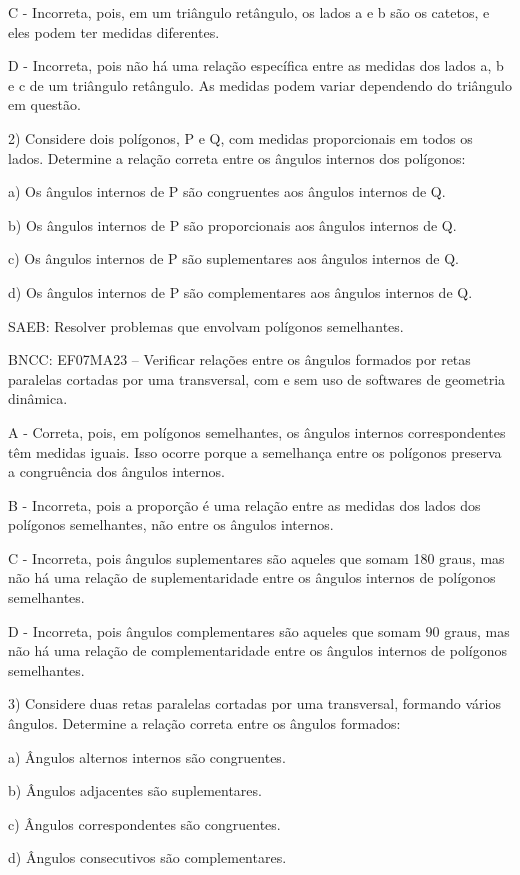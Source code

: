 C - Incorreta, pois, em um triângulo retângulo, os lados a e b são os
catetos, e eles podem ter medidas diferentes.

D - Incorreta, pois não há uma relação específica entre as medidas dos
lados a, b e c de um triângulo retângulo. As medidas podem variar
dependendo do triângulo em questão.

2) Considere dois polígonos, P e Q, com medidas proporcionais em todos
os lados. Determine a relação correta entre os ângulos internos dos
polígonos:

a) Os ângulos internos de P são congruentes aos ângulos internos de Q.

b) Os ângulos internos de P são proporcionais aos ângulos internos de Q.

c) Os ângulos internos de P são suplementares aos ângulos internos de Q.

d) Os ângulos internos de P são complementares aos ângulos internos de
Q.

SAEB: Resolver problemas que envolvam polígonos semelhantes.

BNCC: EF07MA23 -- Verificar relações entre os ângulos formados por retas
paralelas cortadas por uma transversal, com e sem uso de softwares de
geometria dinâmica.

A - Correta, pois, em polígonos semelhantes, os ângulos internos
correspondentes têm medidas iguais. Isso ocorre porque a semelhança
entre os polígonos preserva a congruência dos ângulos internos.

B - Incorreta, pois a proporção é uma relação entre as medidas dos lados
dos polígonos semelhantes, não entre os ângulos internos.

C - Incorreta, pois ângulos suplementares são aqueles que somam 180
graus, mas não há uma relação de suplementaridade entre os ângulos
internos de polígonos semelhantes.

D - Incorreta, pois ângulos complementares são aqueles que somam 90
graus, mas não há uma relação de complementaridade entre os ângulos
internos de polígonos semelhantes.

3) Considere duas retas paralelas cortadas por uma transversal, formando
vários ângulos. Determine a relação correta entre os ângulos formados:

a) Ângulos alternos internos são congruentes.

b) Ângulos adjacentes são suplementares.

c) Ângulos correspondentes são congruentes.

d) Ângulos consecutivos são complementares.

